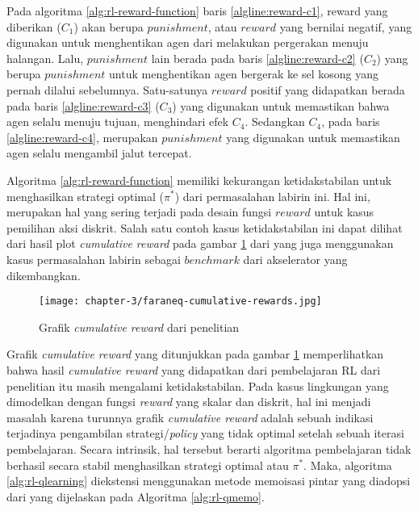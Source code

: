 Pada algoritma \ref{alg:rl-reward-function} baris \ref{algline:reward-c1}, reward yang diberikan ($C_1$) akan berupa $punishment$, atau $reward$ yang bernilai negatif, yang digunakan untuk menghentikan agen dari melakukan pergerakan menuju halangan. Lalu, $punishment$ lain berada pada baris \ref{algline:reward-c2} ($C_2$) yang berupa $punishment$ untuk menghentikan agen bergerak ke sel kosong yang pernah dilalui sebelumnya. Satu-satunya $reward$ positif yang didapatkan berada pada baris \ref{algline:reward-c3} ($C_3$) yang digunakan untuk memastikan bahwa agen selalu menuju tujuan, menghindari efek $C_4$. Sedangkan $C_4$, pada baris \ref{algline:reward-c4}, merupakan $punishment$ yang digunakan untuk memastikan agen selalu mengambil jalut tercepat.

Algoritma \ref{alg:rl-reward-function} memiliki kekurangan ketidakstabilan untuk menghasilkan strategi optimal ($\pi^*$) dari permasalahan labirin ini. Hal ini, merupakan hal yang sering terjadi pada desain fungsi $reward$ untuk kasus pemilihan aksi diskrit. Salah satu contoh kasus ketidakstabilan ini dapat dilihat dari hasil plot \textit{cumulative reward} pada gambar \ref{fig:cumulative-reward-faraneq} dari \parencite{sutisna2023faraneq} yang juga menggunakan kasus permasalahan labirin sebagai $benchmark$ dari akselerator yang dikembangkan.

\begin{figure}[H]
	\centering
	\texttt{[image: chapter-3/faraneq-cumulative-rewards.jpg]}
	\caption{Grafik \textit{cumulative reward} dari penelitian \parencite{sutisna2023faraneq}}
	\label{fig:cumulative-reward-faraneq}
\end{figure}

Grafik \textit{cumulative reward} yang ditunjukkan pada gambar \ref{fig:cumulative-reward-faraneq} memperlihatkan bahwa hasil \textit{cumulative reward} yang didapatkan dari pembelajaran \ac{RL} dari penelitian \parencite{sutisna2023faraneq} itu masih mengalami ketidakstabilan. Pada kasus lingkungan yang dimodelkan dengan fungsi \textit{reward} yang skalar dan diskrit, hal ini menjadi masalah karena turunnya grafik \textit{cumulative reward} adalah sebuah indikasi terjadinya pengambilan strategi/\textit{policy} yang tidak optimal setelah sebuah iterasi pembelajaran. Secara intrinsik, hal tersebut berarti algoritma pembelajaran tidak berhasil secara stabil menghasilkan strategi optimal atau $\pi^*$. Maka, algoritma \ref{alg:rl-qlearning} diekstensi menggunakan metode memoisasi pintar yang diadopsi dari \parencite{mazaya2024reinforcement} yang dijelaskan pada Algoritma \ref{alg:rl-qmemo}.

